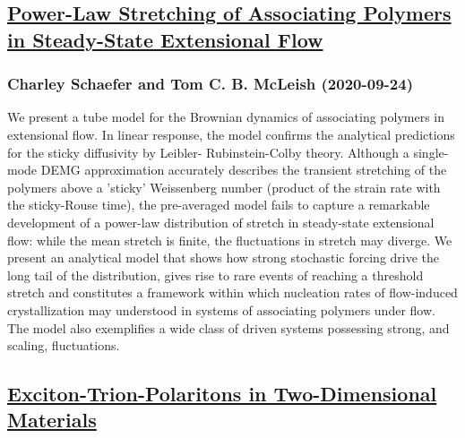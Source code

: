 \subsection*{\href{http://arxiv.org/abs/2009.11949v1}{Power-Law Stretching of Associating Polymers in Steady-State Extensional  Flow}}
\subsubsection*{Charley Schaefer and Tom C. B. McLeish (2020-09-24)}
We present a tube model for the Brownian dynamics of associating polymers in
extensional flow. In linear response, the model confirms the analytical
predictions for the sticky diffusivity by Leibler- Rubinstein-Colby theory.
Although a single-mode DEMG approximation accurately describes the transient
stretching of the polymers above a 'sticky' Weissenberg number (product of the
strain rate with the sticky-Rouse time), the pre-averaged model fails to
capture a remarkable development of a power-law distribution of stretch in
steady-state extensional flow: while the mean stretch is finite, the
fluctuations in stretch may diverge. We present an analytical model that shows
how strong stochastic forcing drive the long tail of the distribution, gives
rise to rare events of reaching a threshold stretch and constitutes a framework
within which nucleation rates of flow-induced crystallization may understood in
systems of associating polymers under flow. The model also exemplifies a wide
class of driven systems possessing strong, and scaling, fluctuations.

\subsection*{\href{http://arxiv.org/abs/2009.13069v1}{Exciton-Trion-Polaritons in Two-Dimensional Materials}}
